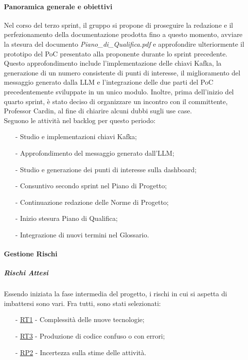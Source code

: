 \documentclass[10pt]{article}
\begin{document}
{{{{    \paragraph{Panoramica generale e obiettivi}\mbox{}\vspace{0.4em}

    Nel corso del terzo sprint, il gruppo si propone di proseguire la redazione e il perfezionamento della documentazione prodotta fino a questo momento, avviare la stesura del documento \textit{Piano\_di\_Qualifica.pdf} e approfondire ulteriormente il prototipo del PoC presentato alla proponente durante lo sprint precedente. Questo approfondimento include l'implementazione delle chiavi Kafka, la generazione di un numero consistente di punti di interesse, il miglioramento del messaggio generato dalla LLM e l'integrazione delle due parti del PoC precedentemente sviluppate in un unico modulo. Inoltre, prima dell'inizio del quarto sprint, è stato deciso di organizzare un incontro con il committente, Professor Cardin, al fine di chiarire alcuni dubbi sugli use case.\\
    Seguono le attività nel backlog per questo periodo:
    \vspace{-0.5em}
    \begin{itemize}
    \setlength\itemsep{-0.2em}
    \item [-] Studio e implementazioni chiavi Kafka;
    \item [-] Approfondimento del messaggio generato dall'LLM;
    \item [-] Studio e generazione dei punti di interesse sulla dashboard;
    \item [-] Consuntivo secondo sprint nel Piano di Progetto;
    \item [-] Continuazione redazione delle Norme di Progetto;
    \item [-] Inizio stesura Piano di Qualifica;
    \item [-] Integrazione di nuovi termini nel Glossario.
    \end{itemize}

    \paragraph{Gestione Rischi}\mbox{}
    \vspace{-1em}
    \subparagraph*{Rischi Attesi}\mbox{}
    Essendo iniziata la fase intermedia del progetto, i rischi in cui si aspetta di imbattersi sono vari. Fra tutti, sono stati selezionati:
    \vspace{-0.5em}
    \begin{itemize}
    \setlength\itemsep{-0.2em}
    \item [-] \hyperref[RT1]{RT1} - Complessità delle nuove tecnologie;
    \item [-] \hyperref[RT3]{RT3} - Produzione di codice confuso o con errori;
    \item [-] \hyperref[RP2]{RP2} - Incertezza sulla stime delle attività.
    \end{itemize}

}}}}
\end{document}

